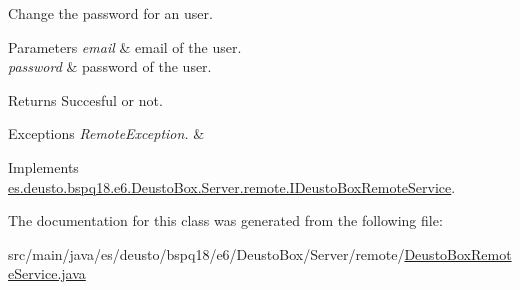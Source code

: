 Change the password for an user.


\begin{DoxyParams}{Parameters}
{\em email} & email of the user. \\
\hline
{\em password} & password of the user. \\
\hline
\end{DoxyParams}
\begin{DoxyReturn}{Returns}
Succesful or not. 
\end{DoxyReturn}

\begin{DoxyExceptions}{Exceptions}
{\em Remote\+Exception.} & \\
\hline
\end{DoxyExceptions}


Implements \mbox{\hyperlink{interfacees_1_1deusto_1_1bspq18_1_1e6_1_1_deusto_box_1_1_server_1_1remote_1_1_i_deusto_box_remote_service_aa73e5a3a839d93e49a0f0005e54e3e07}{es.\+deusto.\+bspq18.\+e6.\+Deusto\+Box.\+Server.\+remote.\+I\+Deusto\+Box\+Remote\+Service}}.



The documentation for this class was generated from the following file\+:\begin{DoxyCompactItemize}
\item 
src/main/java/es/deusto/bspq18/e6/\+Deusto\+Box/\+Server/remote/\mbox{\hyperlink{_deusto_box_remote_service_8java}{Deusto\+Box\+Remote\+Service.\+java}}\end{DoxyCompactItemize}
